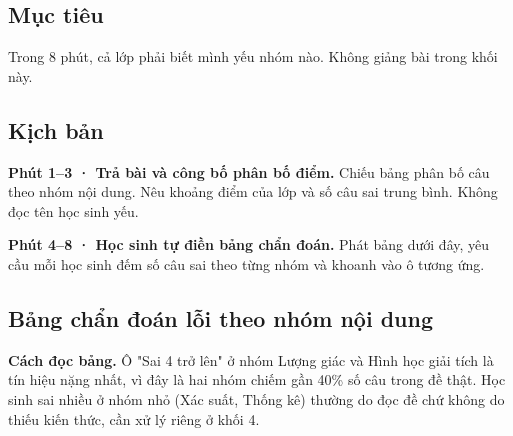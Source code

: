 \documentclass[11pt, a4paper]{article}
\begin{document}
\subsection{Mục tiêu}

Trong 8 phút, cả lớp phải biết mình yếu nhóm nào. Không giảng bài trong khối này.

\subsection{Kịch bản}

\textbf{Phút 1–3 · Trả bài và công bố phân bố điểm.} Chiếu bảng phân bố câu theo nhóm nội dung. Nêu khoảng điểm của lớp và số câu sai trung bình. Không đọc tên học sinh yếu.

\textbf{Phút 4–8 · Học sinh tự điền bảng chẩn đoán.} Phát bảng dưới đây, yêu cầu mỗi học sinh đếm số câu sai theo từng nhóm và khoanh vào ô tương ứng.

\subsection{Bảng chẩn đoán lỗi theo nhóm nội dung}


\textbf{Cách đọc bảng.} Ô "Sai 4 trở lên" ở nhóm Lượng giác và Hình học giải tích là tín hiệu nặng nhất, vì đây là hai nhóm chiếm gần 40\% số câu trong đề thật. Học sinh sai nhiều ở nhóm nhỏ (Xác suất, Thống kê) thường do đọc đề chứ không do thiếu kiến thức, cần xử lý riêng ở khối 4.
\end{document}
